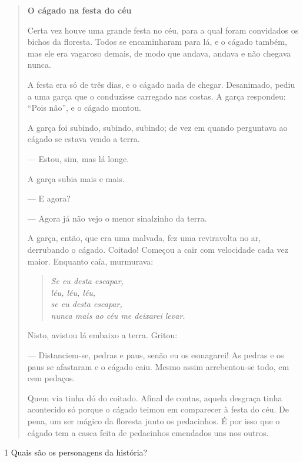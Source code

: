 \begin{quote}
\textbf{O cágado na festa do céu}

Certa vez houve uma grande festa no céu, para a qual foram convidados os
bichos da floresta. Todos se encaminharam para lá, e o cágado também, mas
ele era vagaroso demais, de modo que andava, andava e não chegava
nunca.

A festa era só de três dias, e o cágado nada de chegar. Desanimado, pediu
a uma garça que o conduzisse carregado nas costas. A garça respondeu: ``Pois não'', e
o cágado montou.

A garça foi subindo, subindo, subindo; de vez em quando perguntava ao
cágado se estava vendo a terra.

--- Estou, sim, mas lá longe.

A garça subia mais e mais.

--- E agora?

--- Agora já não vejo o menor sinalzinho da terra.

A garça, então, que era uma malvada, fez uma reviravolta no ar,
derrubando o cágado. Coitado! Começou a cair com velocidade cada vez
maior. Enquanto caía, murmurava:

\begin{verse}
\emph{Se eu desta escapar,}\\
\emph{léu, léu, léu,}\\
\emph{se eu desta escapar,}\\
\emph{nunca mais ao céu me deixarei levar.}
\end{verse}

Nisto, avistou lá embaixo a terra. Gritou:

--- Distanciem-se, pedras e paus, senão eu os esmagarei! As pedras e os paus
se afastaram e o cágado caiu. Mesmo assim arrebentou-se todo, em cem
pedaços.

Quem via tinha dó do coitado. Afinal de contas, aquela
desgraça tinha acontecido só porque o cágado teimou em comparecer à festa do
céu. De pena, um ser mágico da floresta junto os pedacinhos.
É por isso que o cágado tem a casca feita de pedacinhos emendados uns
nos outros.

\end{quote}


\num{1} Quais são os personagens da história?

